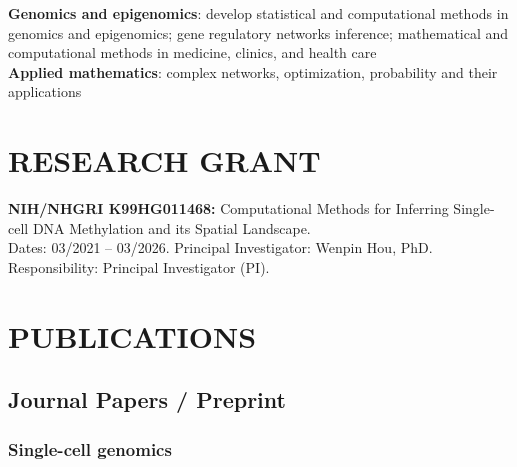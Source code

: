 \documentclass[10pt,letterpaper]{article}
\newcommand{\dn}[1]{{\color{black} {#1}}}
\begin{document}
\textbf{Genomics and epigenomics}: develop statistical and computational methods in genomics and epigenomics; gene regulatory networks inference; mathematical and computational methods in medicine, clinics, and health care \\
\textbf{Applied mathematics}: complex networks, optimization, probability and their applications\\


\section*{RESEARCH GRANT}
{\bf NIH/NHGRI K99HG011468: } Computational Methods for Inferring Single-cell DNA Methylation and its Spatial Landscape. \\
\dn{Dates:} 03/2021 -- 03/2026. 
\dn{Principal Investigator:} Wenpin Hou, PhD.\\
\dn{Responsibility:} Principal Investigator (PI).
    


\section*{PUBLICATIONS}

\subsection*{Journal Papers / Preprint}

\subsubsection*{Single-cell genomics}
\end{document}

